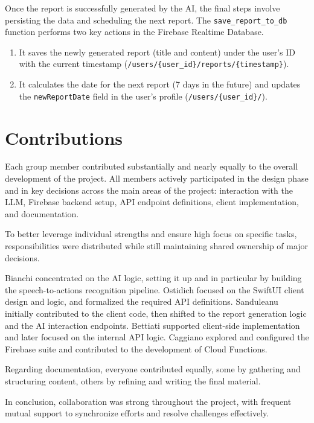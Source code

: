 \documentclass{article}
\begin{document}
Once the report is successfully generated by the AI, the final steps involve persisting the data and scheduling the next report.
The \verb|save_report_to_db| function performs two key actions in the Firebase Realtime Database.

\begin{enumerate}
	\item It saves the newly generated report (title and content) under the user’s ID with the current timestamp (\verb|/users/{user_id}/reports/{timestamp}|).
	\item It calculates the date for the next report (7 days in the future) and updates the \verb|newReportDate| field in the user’s profile (\verb|/users/{user_id}/|).
\end{enumerate}

\section{Contributions}

Each group member contributed substantially and nearly equally to the overall development of the project.
All members actively participated in the design phase and in key decisions across the main areas of the project: interaction with the LLM, Firebase backend setup, API endpoint definitions, client implementation, and documentation.

To better leverage individual strengths and ensure high focus on specific tasks, responsibilities were distributed while still maintaining shared ownership of major decisions.

Bianchi concentrated on the AI logic, setting it up and in particular by building the speech-to-actions recognition pipeline.
Ostidich focused on the SwiftUI client design and logic, and formalized the required API definitions.
Sanduleanu initially contributed to the client code, then shifted to the report generation logic and the AI interaction endpoints.
Bettiati supported client-side implementation and later focused on the internal API logic.
Caggiano explored and configured the Firebase suite and contributed to the development of Cloud Functions.

Regarding documentation, everyone contributed equally, some by gathering and structuring content, others by refining and writing the final material.

In conclusion, collaboration was strong throughout the project, with frequent mutual support to synchronize efforts and resolve challenges effectively.
\end{document}
